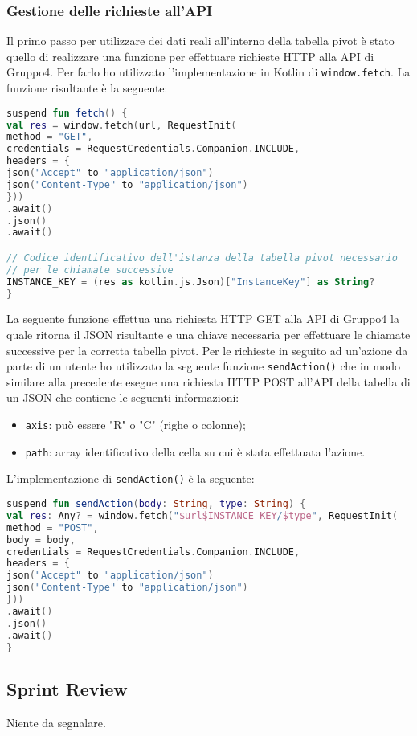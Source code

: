 \subsubsection{Gestione delle richieste all'API}
Il primo passo per utilizzare dei dati reali all'interno della tabella pivot è stato quello di realizzare una funzione per effettuare richieste HTTP alla API di Gruppo4. Per farlo ho utilizzato l'implementazione in Kotlin di \verb|window.fetch|. La funzione risultante è la seguente:
\begin{lstlisting}[caption={Funzione fetch()}, label={lst:bodycells}, language=Kotlin]
suspend fun fetch() {
val res = window.fetch(url, RequestInit(
method = "GET",
credentials = RequestCredentials.Companion.INCLUDE,
headers = {
json("Accept" to "application/json")
json("Content-Type" to "application/json")
}))
.await()
.json()
.await()

// Codice identificativo dell'istanza della tabella pivot necessario
// per le chiamate successive
INSTANCE_KEY = (res as kotlin.js.Json)["InstanceKey"] as String?
}
\end{lstlisting}
La seguente funzione effettua una richiesta HTTP GET alla API di Gruppo4 la quale ritorna il JSON risultante e una chiave necessaria per effettuare le chiamate successive per la corretta tabella pivot. Per le richieste in seguito ad un'azione da parte di un utente ho utilizzato la seguente funzione \verb|sendAction()| che in modo similare alla precedente esegue una richiesta HTTP POST all'API della tabella di un JSON che contiene le seguenti informazioni:
\begin{itemize}
	\item \verb|axis|: può essere "R" o "C" (righe o colonne);
	\item \verb|path|: array identificativo della cella su cui è stata effettuata l'azione.
\end{itemize}
L'implementazione di \verb|sendAction()| è la seguente: 
\begin{lstlisting}[caption={Funzione sendAction()}, label={lst:bodycells}, language=Kotlin]
suspend fun sendAction(body: String, type: String) {
val res: Any? = window.fetch("$url$INSTANCE_KEY/$type", RequestInit(
method = "POST",
body = body,
credentials = RequestCredentials.Companion.INCLUDE,
headers = {
json("Accept" to "application/json")
json("Content-Type" to "application/json")
}))
.await()
.json()
.await()
}
\end{lstlisting}
\subsection{Sprint Review}
Niente da segnalare.

